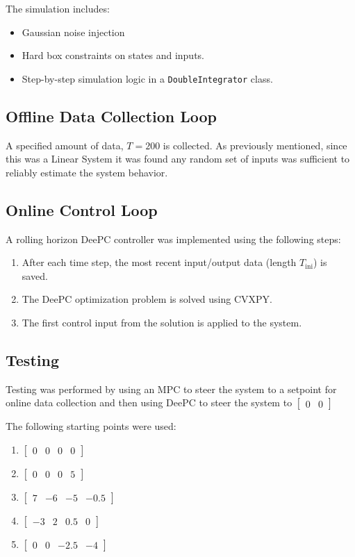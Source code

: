 \documentclass[11pt,a4paper]{article}
\begin{document}
The simulation includes:
\begin{itemize}
    \item Gaussian noise injection
    \item Hard box constraints on states and inputs.
    \item Step-by-step simulation logic in a \texttt{DoubleIntegrator} class.
\end{itemize}

\subsection{Offline Data Collection Loop}
A specified amount of data, $T = 200$ is collected. As previously mentioned, since this was a Linear System it was found any random set of inputs was sufficient to reliably estimate the system behavior.

\subsection{Online Control Loop}
A rolling horizon DeePC controller was implemented using the following steps:
\begin{enumerate}
    \item After each time step, the most recent input/output data (length \(T_{\text{ini}}\)) is saved. 
    \item The DeePC optimization problem is solved using CVXPY.
    \item The first control input from the solution is applied to the system.
\end{enumerate}

\subsection{Testing}
Testing was performed by using an MPC to steer the system to a setpoint for online data collection and then using DeePC to steer the system to $\begin{bmatrix}
    0 & 0
\end{bmatrix}$

The following starting points were used:
\begin{enumerate}
    \item $\begin{bmatrix}0 & 0 & 0 & 0\end{bmatrix}$
    \item $\begin{bmatrix}0 & 0 & 0 & 5\end{bmatrix}$
    \item $\begin{bmatrix}7 & -6 & -5 & -0.5\end{bmatrix}$
    \item $\begin{bmatrix}-3 & 2 & 0.5 & 0\end{bmatrix}$
    \item $\begin{bmatrix}0 & 0 & -2.5 & -4\end{bmatrix}$
\end{enumerate}
\end{document}
